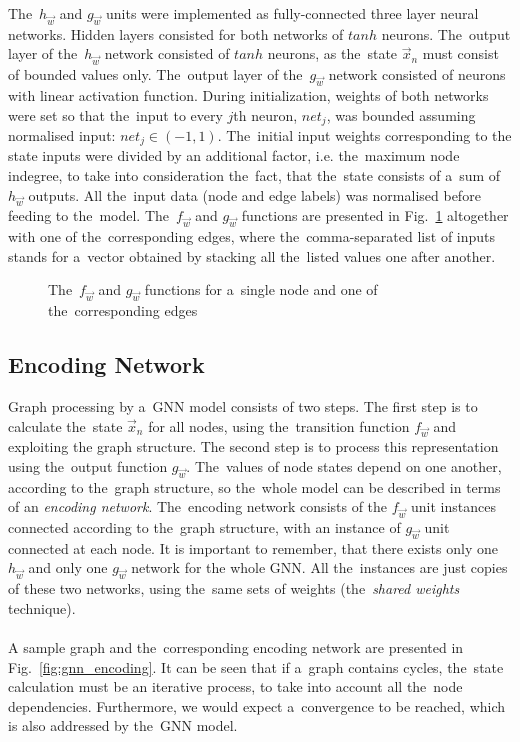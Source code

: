\documentclass{llncs}
\begin{document}
\noindent The~$h_{\vec{w}}$ and $g_{\vec{w}}$ units were implemented as fully-connected three layer neural networks. Hidden layers consisted for both networks of $tanh$ neurons. The~output layer of the~$h_{\vec{w}}$ network consisted of $tanh$ neurons, as the~state $\vec{x}_n$ must consist of bounded values only. The~output layer of the~$g_{\vec{w}}$ network consisted of neurons with linear activation function. During initialization, weights of both networks were set so that the~input to every $j$th neuron, $net_j$, was bounded assuming normalised input: $net_j \in (-1, 1)$. The~initial input weights corresponding to the state inputs were divided by an additional factor, i.e. the~maximum node indegree, to take into consideration the~fact, that the~state consists of a~sum of $h_{\vec{w}}$ outputs. All the~input data (node and edge labels) was normalised before feeding to the~model. The~$f_{\vec{w}}$ and $g_{\vec{w}}$ functions are presented in Fig.~\ref{fig:gnn_fg} altogether with one of the~corresponding edges, where the~comma-separated list of inputs stands for a~vector obtained by stacking all the~listed values one after another.

\begin{figure}[h!]
\begin{center}
	\caption[]{The~$f_{\vec{w}}$ and  $g_{\vec{w}}$ functions for a~single node and one of the~corresponding edges}
	\label{fig:gnn_fg}
\end{center}
\end{figure}


\subsection{Encoding Network}
Graph processing by a~GNN model consists of two steps. The first step is to calculate the~state $\vec{x}_n$ for all nodes, using the~transition function $f_{\vec{w}}$ and exploiting the graph structure. The second step is to process this representation using the~output function $g_{\vec{w}}$. The~values of node states depend on one another, according to the~graph structure, so the~whole model can be described in terms of an \emph{encoding network}. The~encoding network consists of the $f_{\vec{w}}$ unit instances connected according to the~graph structure, with an instance of $g_{\vec{w}}$ unit connected at each node. It is important to remember, that there exists only one $h_{\vec{w}}$ and only one $g_{\vec{w}}$ network for the whole GNN. All the~instances are just copies of these two networks, using the~same sets of weights (the~\emph{shared weights} technique).
\\\\
A sample graph and the~corresponding encoding network are presented in Fig.~\ref{fig:gnn_encoding}. It can be seen that if a~graph contains cycles, the~state calculation must be an iterative process, to take into account all the~node dependencies. Furthermore, we would expect a~convergence to be reached, which is also addressed by the~GNN model.
\end{document}
